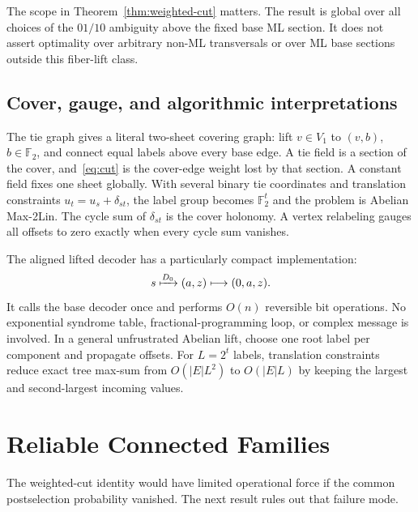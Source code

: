 \documentclass[journal]{IEEEtran}
\theoremstyle{definition}
\theoremstyle{remark}
\newcommand{\F}{\mathbb F}
\begin{document}
The scope in Theorem~\ref{thm:weighted-cut} matters.  The result is global over
all choices of the $01/10$ ambiguity above the fixed base ML section.  It does
not assert optimality over arbitrary non-ML transversals or over ML base
sections outside this fiber-lift class.

\subsection{Cover, gauge, and algorithmic interpretations}

The tie graph gives a literal two-sheet covering graph: lift $v\in V_1$ to
$(v,b)$, $b\in\F_2$, and connect equal labels above every base edge.  A tie
field is a section of the cover, and~\eqref{eq:cut} is the cover-edge weight
lost by that section.  A constant field fixes one sheet globally.  With
several binary tie coordinates and translation constraints
$u_t=u_s+\delta_{st}$, the label group becomes $\F_2^t$ and the problem is
Abelian Max-2Lin.  The cycle sum of $\delta_{st}$ is the cover holonomy.  A
vertex relabeling gauges all offsets to zero exactly when every cycle sum
vanishes.

The aligned lifted decoder has a particularly compact implementation:
\begin{equation}
 s\xmapsto{D_0}(a,z)\longmapsto(0,a,z).
 \label{eq:aligned-algorithm}
\end{equation}
It calls the base decoder once and performs $O(n)$ reversible bit operations.
No exponential syndrome table, fractional-programming loop, or complex
message is involved.  In a general unfrustrated Abelian lift, choose one root
label per component and propagate offsets.  For $L=2^t$ labels, translation
constraints reduce exact tree max-sum from $O(|E|L^2)$ to $O(|E|L)$ by keeping
the largest and second-largest incoming values.

\section{Reliable Connected Families}
\label{sec:reliable}

The weighted-cut identity would have limited operational force if the common
postselection probability vanished.  The next result rules out that failure
mode.
\end{document}
